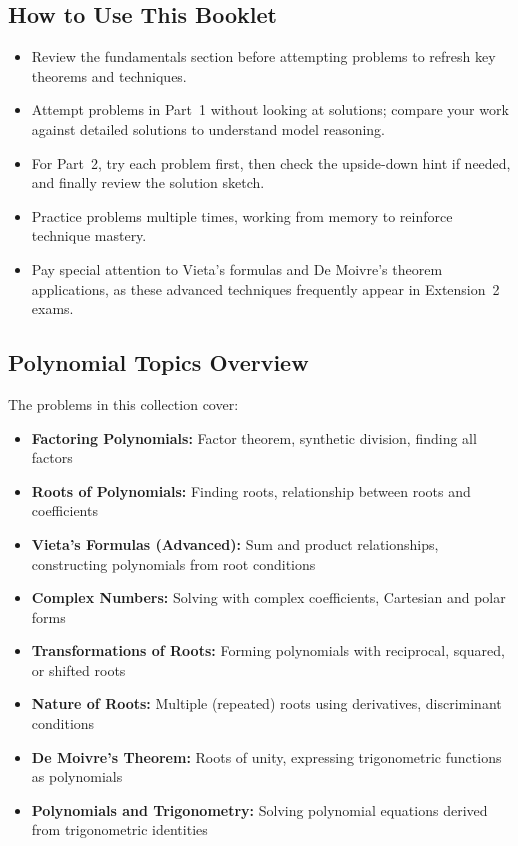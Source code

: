 \documentclass[12pt]{article}
\begin{document}
\subsection{How to Use This Booklet}
\begin{itemize}[leftmargin=*]
  \item Review the fundamentals section before attempting problems to refresh key theorems and techniques.
  \item Attempt problems in Part~1 without looking at solutions; compare your work against detailed solutions to understand model reasoning.
  \item For Part~2, try each problem first, then check the upside-down hint if needed, and finally review the solution sketch.
  \item Practice problems multiple times, working from memory to reinforce technique mastery.
  \item Pay special attention to Vieta's formulas and De Moivre's theorem applications, as these advanced techniques frequently appear in Extension~2 exams.
\end{itemize}

\subsection{Polynomial Topics Overview}
The problems in this collection cover:
\begin{itemize}[leftmargin=*]
  \item \textbf{Factoring Polynomials:} Factor theorem, synthetic division, finding all factors
  \item \textbf{Roots of Polynomials:} Finding roots, relationship between roots and coefficients
  \item \textbf{Vieta's Formulas (Advanced):} Sum and product relationships, constructing polynomials from root conditions
  \item \textbf{Complex Numbers:} Solving with complex coefficients, Cartesian and polar forms
  \item \textbf{Transformations of Roots:} Forming polynomials with reciprocal, squared, or shifted roots
  \item \textbf{Nature of Roots:} Multiple (repeated) roots using derivatives, discriminant conditions
  \item \textbf{De Moivre's Theorem:} Roots of unity, expressing trigonometric functions as polynomials
  \item \textbf{Polynomials and Trigonometry:} Solving polynomial equations derived from trigonometric identities
\end{itemize}
\end{document}
